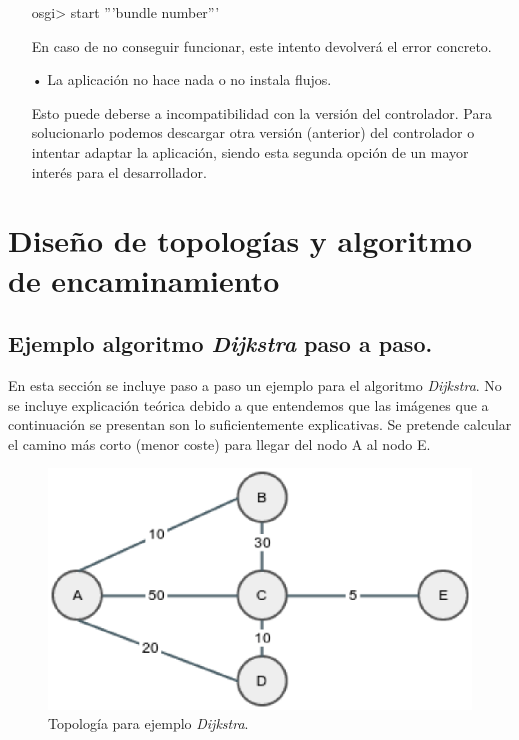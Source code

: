\documentclass[a4paper,11pt]{book}
\begin{document}
\begin{itemize}
\begin{python}
osgi> start '''bundle number'''
\end{python}

En caso de no conseguir funcionar, este intento devolverá el error concreto.

\item[•] La aplicación no hace nada o no instala flujos.

Esto puede deberse a incompatibilidad con la versión del controlador. Para solucionarlo podemos descargar otra versión (anterior) del controlador o intentar adaptar la aplicación, siendo esta segunda opción de un mayor interés para el desarrollador.

\end{itemize}

\newpage
\chapter{Diseño de topologías y algoritmo de encaminamiento}\label{apeB}
\section{Ejemplo algoritmo \textit{Dijkstra} paso a paso.}\label{dijkstraPaso}
En esta sección se incluye paso a paso un ejemplo para el algoritmo \textit{Dijkstra}. No se incluye explicación teórica debido a que entendemos que las imágenes que a continuación se presentan son lo suficientemente explicativas. Se pretende calcular el camino más corto (menor coste) para llegar del nodo A al nodo E.

\begin{figure}[tb]
\centering
\includegraphics[scale=0.6]{./figuras/dijkstra1}
\caption{Topología para ejemplo \textit{Dijkstra}.}
\label{dijkstra1}
\end{figure}
\end{document}
